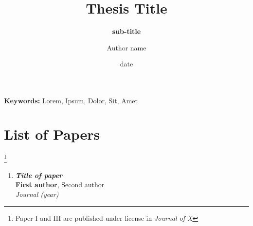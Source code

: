 \documentclass[electronic]{kthesis}
\begin{document}
\title{ Thesis Title }
\subtitle{\textbf{sub-title}}
\author{Author name}
\date{date}
\address{KTH Royal Institute of Technology \\School of Electrical Engineering and Computer Science\\ Division of Fusion Plasma Physics \\ SE-10044 Stockholm\\ Sweden}

\maketitle

\frontmatter %
\begin{abstract}
\noindent \lipsum[1]

\end{abstract}

\bigskip \bigskip \bigskip \bigskip \bigskip

\setlength{\leftskip}{0.3 cm} \textbf {Keywords:} Lorem, Ipsum, Dolor, Sit, Amet

\newpage
{}
\begin{abstract}
\noindent \lipsum[1]
\end{abstract}

\chapter{List of Papers}

\let\thefootnote\relax\footnote{Paper I and III are published under license in \textit{Journal of X}}
\begin{enumerate}[I]
	\item \textbf{\textit{Title of paper}} \\
		\textbf{First author}, Second author \\
		\textit{Journal (year)}
\end{enumerate}
\end{document}
